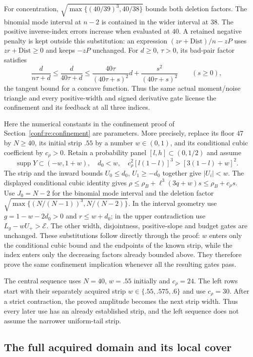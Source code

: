 For concentration, $\sqrt{\max\{(40/39)^3,40/38\}}$ bounds both
deletion factors. The binomial mode interval at $n-2$ is contained in
the wider interval at $38$. The positive inverse-index errors increase
when evaluated at $40$. A retained negative penalty is kept outside
this substitution: an expression $(zr+\mathrm{Dist})/n-zP$ uses
$zr+\mathrm{Dist}\ge0$ and keeps $-zP$ unchanged. For $d\ge0$,
$\tau>0$, its bad-pair factor satisfies
\[
 \frac{d}{n\tau+d}\le\frac{d}{40\tau+d}
 \le\frac{40\tau}{(40\tau+s)^2}d+
       \frac{s^2}{(40\tau+s)^2}\qquad(s\ge0),
\]
the tangent bound for a concave function. Thus the same actual
moment/noise triangle and every positive-width and signed derivative
gate license the confinement and its feedback at all three indices.

Here the numerical constants in the confinement proof of
Section~\ref{conf:re:confinement} are parameters. More precisely,
replace its floor $47$ by $N\ge40$, its initial strip $.55$ by a
number $w\in(0,1)$, and its conditional cubic coefficient by
$c_\rho>0$. Retain a probability panel $[l,h]\subset(0,1/2)$ and assume
\[
 \operatorname{supp}Y\subset(-w,1+w),\quad d_0<w,
 \quad c_\rho^2[l(1-l)]^3>[3(1-l)+w]^2.
\]
The strip and the inward bounds $U_0\le d_0$, $U_1\ge-d_0$
together give $|U_i|<w$. The displayed conditional cubic identity gives
$\rho\le\rho_B+\ell^3(3q+w)s\le\rho_B+c_\rho s$.
Use $J_0=N-2$ for the binomial mode interval and the deletion factor
$\sqrt{\max\{(N/(N-1))^3,N/(N-2)\}}$. In the interval geometry
use $g=1-w-2d_0>0$ and $r\le w+d_0$; in the upper contradiction
use $L_g-wU_+>\mathcal E$. The other width, disjointness,
positive-slope and budget gates are unchanged. These substitutions
follow directly through the proof: $w$ enters only the conditional
cubic bound and the endpoints of the known strip, while the index
enters only the decreasing factors already bounded above. They
therefore prove the same confinement implication whenever all the
resulting gates pass.

The central sequence uses $N=40$, $w=.55$ initially and
$c_\rho=24$. The left rows start with their separately acquired
strip $w\in\{.55,.575,.6\}$ and use $c_\rho=30$. After a strict
contraction, the proved amplitude becomes the next strip width.
Thus every later use has an already established strip, and the
left sequence does not assume the narrower uniform-tail strip.

\subsection{The full acquired domain and its local cover}

